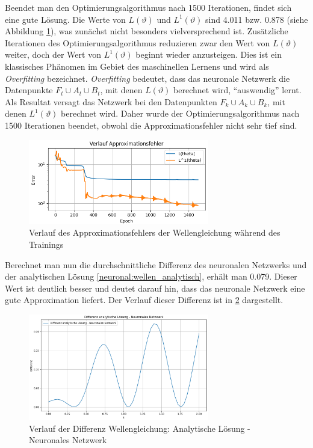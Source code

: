 Beendet man den Optimierungsalgorithmus nach 1500 Iterationen, findet sich eine gute Lösung.
Die Werte von $L(\vartheta)$ und $L^1(\vartheta)$ sind 4.011 bzw. 0.878 (siehe Abbildung \ref{fig:fehler_wave_good}), was zunächst nicht besonders vielversprechend ist.
Zusätzliche Iterationen des Optimierungsalgorithmus reduzieren zwar den Wert von $L(\vartheta)$ weiter, doch der Wert von $L^1(\vartheta)$ beginnt wieder anzusteigen.
Dies ist ein klassisches Phänomen im Gebiet des maschinellen Lernens und wird als \emph{Overfitting} bezeichnet.
\emph{Overfitting} bedeutet, dass das neuronale Netzwerk die Datenpunkte $F_t\cup A_t \cup B_t$, mit denen $L(\vartheta)$ berechnet wird, ``auswendig'' lernt.
Als Resultat versagt das Netzwerk bei den Datenpunkten $F_k\cup A_k \cup B_k$, mit denen $L^1(\vartheta)$ berechnet wird.
Daher wurde der Optimierungsalgorithmus nach 1500 Iterationen beendet, obwohl die Approximationsfehler nicht sehr tief sind.
\begin{figure}
    \centering
    \hspace*{-0.1\textwidth}
    \includegraphics[width=0.7\textwidth]{papers/neuronal/images/approximation_error_wave_good.png}
    \caption{Verlauf des Approximationsfehlers der Wellengleichung während des Trainings}
    \label{fig:fehler_wave_good}
\end{figure}

Berechnet man nun die durchschnittliche Differenz des neuronalen Netzwerks und der analytischen Lösung \eqref{neuronal:wellen_analytisch}, erhält man 0.079.
Dieser Wert ist deutlich besser und deutet darauf hin, dass das neuronale Netzwerk eine gute Approximation liefert. 
Der Verlauf dieser Differenz ist in \ref{fig:differenz_wellen} dargestellt.
\begin{figure}
    \centering
    \includegraphics[width=0.7\textwidth]{papers/neuronal/images/wellen_analytisch_neuronal.png}
    \caption{Verlauf der Differenz Wellengleichung: Analytische Lösung - Neuronales Netzwerk}
    \label{fig:differenz_wellen}
\end{figure}

